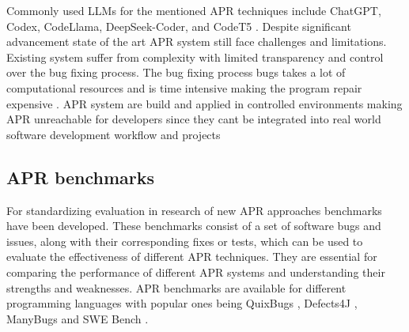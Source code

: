 Commonly used LLMs for the mentioned APR techniques include ChatGPT, Codex, CodeLlama, DeepSeek-Coder, and CodeT5 \cite{houLargeLanguageModels2024, yinThinkRepairSelfDirectedAutomated2024,anandComprehensiveSurveyAIDriven2024}.
Despite significant advancement state of the art APR system still face challenges and limitations. Existing system suffer from complexity with limited transparency and control over the bug fixing process.\cite{xiaAgentlessDemystifyingLLMbased2024,puvvadiCodingAgentsComprehensive2025, houLargeLanguageModels2024} The bug fixing process bugs takes a lot of computational resources and is time intensive making the program repair expensive \cite{sobaniaAnalysisAutomaticBug2023, puvvadiCodingAgentsComprehensive2025}. APR system are build and applied in controlled environments making APR unreachable for developers since they cant be integrated into real world software development workflow and projects\cite{meemExploringExperiencesAutomated2024,puvvadiCodingAgentsComprehensive2025}

\subsection{APR benchmarks}
For standardizing evaluation in research of new APR approaches benchmarks have been developed. These benchmarks consist of a set of software bugs and issues, along with their corresponding fixes or tests, which can be used to evaluate the effectiveness of different APR techniques. \cite{anandComprehensiveSurveyAIDriven2024} They are essential for comparing the performance of different APR systems and understanding their strengths and weaknesses. \cite{puvvadiCodingAgentsComprehensive2025} APR benchmarks are available for different programming languages with popular ones being QuixBugs \cite{linQuixBugsMultilingualProgram2017}, Defects4J \cite{justDefects4JDatabaseExisting2014}, ManyBugs \cite{legouesManyBugsIntroClassBenchmarks2015} and SWE Bench \cite{jimenezSWEbenchCanLanguage2024}. \cite{wangSoftwareDevelopmentLife2025}

